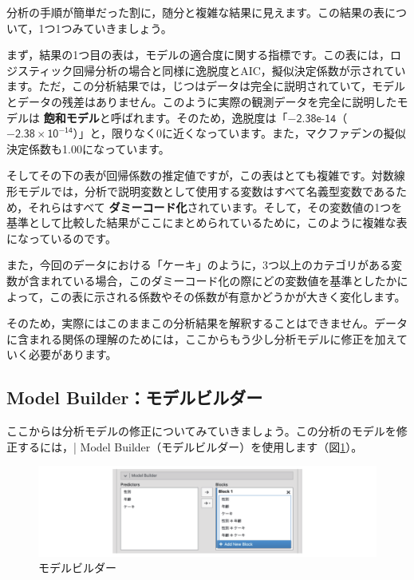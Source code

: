 \documentclass[
  12pt,
  a5jpaper,
  lualatex, ja=standard]{bxjsbook}
\renewcommand{\emph}[1]{\textbf{\color{emph} #1}}
\begin{document}
分析の手順が簡単だった割に，随分と複雑な結果に見えます。この結果の表について，1つ1つみていきましょう。

まず，結果の1つ目の表は，モデルの適合度に関する指標です。この表には，ロジスティック回帰分析の場合と同様に逸脱度とAIC，擬似決定係数が示されています。ただ，この分析結果では，じつはデータは完全に説明されていて，モデルとデータの残差はありません。このように実際の観測データを完全に説明したモデルは\emph{飽和モデル}と呼ばれます。そのため，逸脱度は「\(-\textsf{2.38e-14}\)（\(-\textsf{2.38}\times \textsf{10}^{-\textsf{14}}\)）」と，限りなく0に近くなっています。また，マクファデンの擬似決定係数も1.00になっています。

そしてその下の表が回帰係数の推定値ですが，この表はとても複雑です。対数線形モデルでは，分析で説明変数として使用する変数はすべて名義型変数であるため，それらはすべて\emph{ダミーコード化}されています。そして，その変数値の1つを基準として比較した結果がここにまとめられているために，このように複雑な表になっているのです。

また，今回のデータにおける「ケーキ」のように，3つ以上のカテゴリがある変数が含まれている場合，このダミーコード化の際にどの変数値を基準としたかによって，この表に示される係数やその係数が有意かどうかが大きく変化します。

そのため，実際にはこのままこの分析結果を解釈することはできません。データに含まれる関係の理解のためには，ここからもう少し分析モデルに修正を加えていく必要があります。

\hypertarget{sub:frequencies-loglin-modelbuilder}{%
\subsection{Model Builder：モデルビルダー}\label{sub:frequencies-loglin-modelbuilder}}

ここからは分析モデルの修正についてみていきましょう。この分析のモデルを修正するには，\colorbox{bar}{\textcolor{gmoji2}{| Model Builder}}（モデルビルダー）を使用します（図\ref{fig:frequencies-loglin-modelbuilder}）。

\begin{figure}[!ht]

{\centering \includegraphics[width=1\linewidth]{images/frequencies/loglin-modelbuilder} 

}

\caption{モデルビルダー}\label{fig:frequencies-loglin-modelbuilder}
\end{figure}
\end{document}
